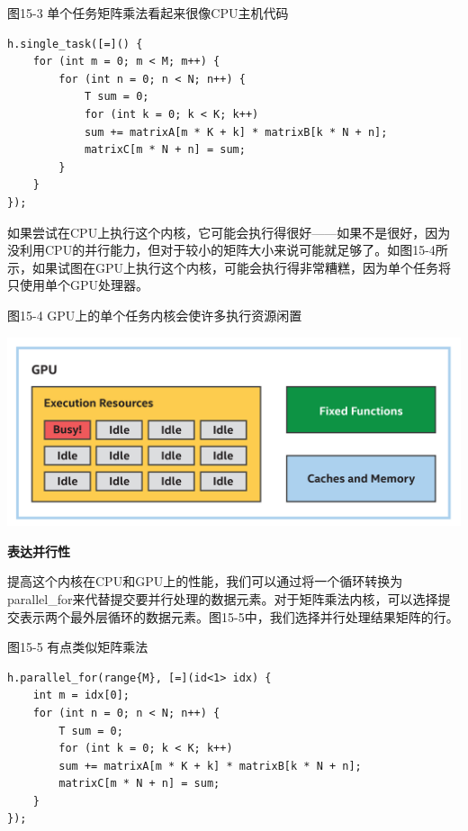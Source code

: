 \hspace*{\fill} \par %
图15-3 单个任务矩阵乘法看起来很像CPU主机代码
\begin{lstlisting}[caption={}]
h.single_task([=]() {
	for (int m = 0; m < M; m++) {
		for (int n = 0; n < N; n++) {
			T sum = 0;
			for (int k = 0; k < K; k++)
			sum += matrixA[m * K + k] * matrixB[k * N + n];
			matrixC[m * N + n] = sum;
		}
	}
});
\end{lstlisting}

如果尝试在CPU上执行这个内核，它可能会执行得很好——如果不是很好，因为没利用CPU的并行能力，但对于较小的矩阵大小来说可能就足够了。如图15-4所示，如果试图在GPU上执行这个内核，可能会执行得非常糟糕，因为单个任务将只使用单个GPU处理器。\par

\hspace*{\fill} \par %
图15-4 GPU上的单个任务内核会使许多执行资源闲置
\begin{center}
	\includegraphics[width=1.0\textwidth]{content/chapter-15/images/4}
\end{center}

\hspace*{\fill} \par %
\textbf{表达并行性}

提高这个内核在CPU和GPU上的性能，我们可以通过将一个循环转换为parallel\_for来代替提交要并行处理的数据元素。对于矩阵乘法内核，可以选择提交表示两个最外层循环的数据元素。图15-5中，我们选择并行处理结果矩阵的行。\par

\hspace*{\fill} \par %
图15-5 有点类似矩阵乘法
\begin{lstlisting}[caption={}]
h.parallel_for(range{M}, [=](id<1> idx) {
	int m = idx[0];
	for (int n = 0; n < N; n++) {
		T sum = 0;
		for (int k = 0; k < K; k++)
		sum += matrixA[m * K + k] * matrixB[k * N + n];
		matrixC[m * N + n] = sum;
	}
});
\end{lstlisting}

